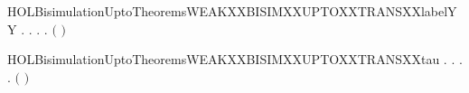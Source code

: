\begin{SaveVerbatim}{HOLBisimulationUptoTheoremsWEAKXXBISIMXXUPTOXXTRANSXXlabelYY}
\HOLTokenTurnstile{} \HOLSymConst{\HOLTokenForall{}}.
         \HOLSymConst{\HOLTokenImp{}}
       \HOLSymConst{\HOLTokenForall{}} .
              \HOLSymConst{\HOLTokenImp{}}
           \HOLSymConst{\HOLTokenForall{}} .
                \HOLTokenTransBegin{} \HOLTokenTransEnd {} \HOLSymConst{\HOLTokenImp{}}
               \HOLSymConst{\HOLTokenExists{}}.
                    \HOLTokenWeakTransBegin{} \HOLTokenWeakTransEnd {} \HOLSymConst{\HOLTokenConj{}}
                   \ensuremath{(}    \ensuremath{)}  
\end{SaveVerbatim}
\newcommand{\HOLBisimulationUptoTheoremsWEAKXXBISIMXXUPTOXXTRANSXXlabelYY}{\UseVerbatim{HOLBisimulationUptoTheoremsWEAKXXBISIMXXUPTOXXTRANSXXlabelYY}}
\begin{SaveVerbatim}{HOLBisimulationUptoTheoremsWEAKXXBISIMXXUPTOXXTRANSXXtau}
\HOLTokenTurnstile{} \HOLSymConst{\HOLTokenForall{}}.
         \HOLSymConst{\HOLTokenImp{}}
       \HOLSymConst{\HOLTokenForall{}} .
              \HOLSymConst{\HOLTokenImp{}}
           \HOLSymConst{\HOLTokenForall{}}.
                \HOLTokenTransBegin\HOLConst{\ensuremath{\tau}}\HOLTokenTransEnd {} \HOLSymConst{\HOLTokenImp{}}
               \HOLSymConst{\HOLTokenExists{}}.
                      \HOLSymConst{\HOLTokenConj{}}
                   \ensuremath{(}    \ensuremath{)}  
\end{SaveVerbatim}
\newcommand{\HOLBisimulationUptoTheoremsWEAKXXBISIMXXUPTOXXTRANSXXtau}{\UseVerbatim{HOLBisimulationUptoTheoremsWEAKXXBISIMXXUPTOXXTRANSXXtau}}
